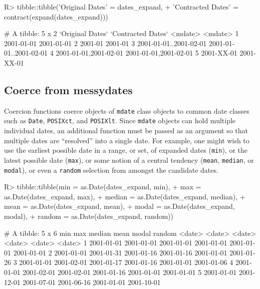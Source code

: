 \documentclass[
]{jss}
\begin{document}
\begin{CodeChunk}
\begin{CodeInput}
R> tibble::tibble('Original Dates' = dates_expand,
+                'Contracted Dates' = contract(expand(dates_expand)))
\end{CodeInput}
\begin{CodeOutput}
# A tibble: 5 x 2
  `Original Dates`        `Contracted Dates`     
  <mdate>                 <mdate>                
1 2001-01-01              2001-01-01             
2 2001-01                 2001-01                
3 2001-01-01..2001-02-01  2001-01-01..2001-02-01 
4 {2001-01-01,2001-02-01} {2001-01-01,2001-02-01}
5 2001-XX-01              2001-XX-01             
\end{CodeOutput}
\end{CodeChunk}

\hypertarget{coerce-from-messydates}{%
\subsection{Coerce from messydates}\label{coerce-from-messydates}}

Coercion functions coerce objects of \texttt{mdate} class objects to
common date classes such as \texttt{Date}, \texttt{POSIXct}, and
\texttt{POSIXlt}. Since \texttt{mdate} objects can hold multiple
individual dates, an additional function must be passed as an argument
so that multiple dates are ``resolved'' into a single date. For example,
one might wish to use the earliest possible date in a range, or set, of
expanded dates (\texttt{min}), or the latest possible date
(\texttt{max}), or some notion of a central tendency (\texttt{mean},
\texttt{median}, or \texttt{modal}), or even a \texttt{random} selection
from amongst the candidate dates.

\begin{CodeChunk}
\begin{CodeInput}
R> tibble::tibble(min = as.Date(dates_expand, min),
+                max = as.Date(dates_expand, max),
+                median = as.Date(dates_expand, median),
+                mean = as.Date(dates_expand, mean),
+                modal = as.Date(dates_expand, modal),
+                random = as.Date(dates_expand, random))
\end{CodeInput}
\begin{CodeOutput}
# A tibble: 5 x 6
  min        max        median     mean       modal      random    
  <date>     <date>     <date>     <date>     <date>     <date>    
1 2001-01-01 2001-01-01 2001-01-01 2001-01-01 2001-01-01 2001-01-01
2 2001-01-01 2001-01-31 2001-01-16 2001-01-16 2001-01-01 2001-01-26
3 2001-01-01 2001-02-01 2001-01-17 2001-01-16 2001-01-01 2001-01-06
4 2001-01-01 2001-02-01 2001-02-01 2001-01-16 2001-01-01 2001-01-01
5 2001-01-01 2001-12-01 2001-07-01 2001-06-16 2001-01-01 2001-10-01
\end{CodeOutput}
\end{CodeChunk}
\end{document}
